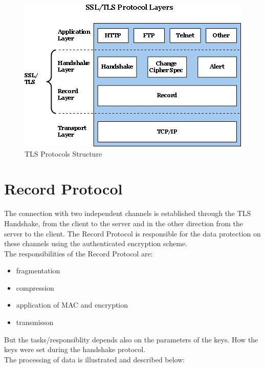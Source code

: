 \begin{figure}[H]
	\centering
		\includegraphics[scale=1]{images/tls_structure.jpg}
	\caption{TLS Protocols Structure \cite{ms:overview}}
	\label{fig:tls_structure}
\end{figure}

\section{Record Protocol}
\label{sec:record_protocol}

The connection with two independent channels is established through the TLS Handshake, from the client to the server and in the other direction from the server to the client. The Record Protocol is responsible for the data protection on these channels using the authenticated encryption scheme.\\
The responsibilities of the Record Protocol are:
\begin{itemize}
	\item fragmentation
	\item compression
	\item application of MAC and encryption
	\item transmisson 
\end{itemize}
But the tasks/responsiblity depends also on the parameters of the keys. How the keys were set during the handshake protocol. \\

The processing of data is illustrated and described below:      


